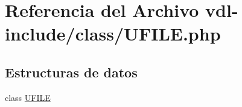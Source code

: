 \hypertarget{UFILE_8php}{\section{Referencia del Archivo vdl-\/include/class/\-U\-F\-I\-L\-E.php}
\label{UFILE_8php}
}
\subsection*{Estructuras de datos}
\begin{DoxyCompactItemize}
\item 
class \hyperlink{classUFILE}{U\-F\-I\-L\-E}
\end{DoxyCompactItemize}
